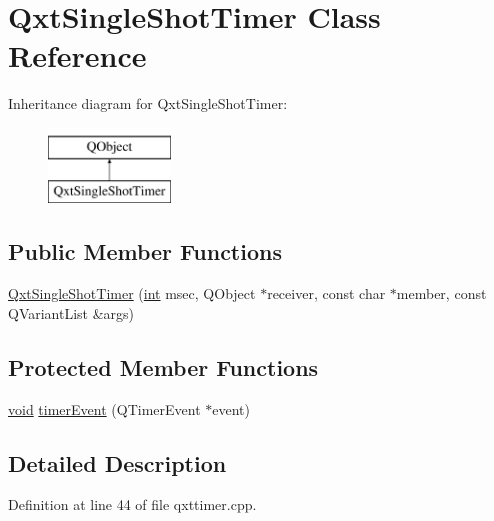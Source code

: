 \hypertarget{class_qxt_single_shot_timer}{\section{Qxt\-Single\-Shot\-Timer Class Reference}
\label{class_qxt_single_shot_timer}
}
Inheritance diagram for Qxt\-Single\-Shot\-Timer\-:\begin{figure}[H]
\begin{center}
\leavevmode
\includegraphics[height=2.000000cm]{class_qxt_single_shot_timer}
\end{center}
\end{figure}
\subsection*{Public Member Functions}
\begin{DoxyCompactItemize}
\item 
\hyperlink{class_qxt_single_shot_timer_a8122b01b81c40170a9afa69befac231c}{Qxt\-Single\-Shot\-Timer} (\hyperlink{ioapi_8h_a787fa3cf048117ba7123753c1e74fcd6}{int} msec, Q\-Object $\ast$receiver, const char $\ast$member, const Q\-Variant\-List \&args)
\end{DoxyCompactItemize}
\subsection*{Protected Member Functions}
\begin{DoxyCompactItemize}
\item 
\hyperlink{group___u_a_v_objects_plugin_ga444cf2ff3f0ecbe028adce838d373f5c}{void} \hyperlink{class_qxt_single_shot_timer_a47f5df4b1ba82ac558d850a8983b3487}{timer\-Event} (Q\-Timer\-Event $\ast$event)
\end{DoxyCompactItemize}


\subsection{Detailed Description}


Definition at line 44 of file qxttimer.\-cpp.



